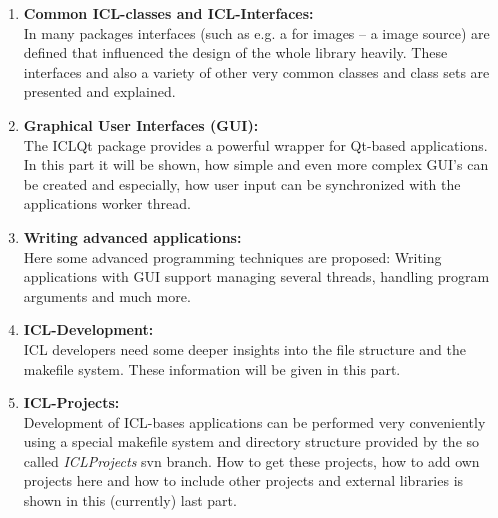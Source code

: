 \begin{enumerate}
\item \textbf{Common ICL-classes and ICL-Interfaces:}\\ In many packages interfaces (such as e.g. a  for images -- a image source) are defined that influenced the design of the whole library heavily. These interfaces and also a variety of other very common classes and class sets are presented and explained.
\item \textbf{Graphical User Interfaces (GUI):}\\ The ICLQt package provides a powerful wrapper for Qt-based applications. In this part it will be shown, how simple and even more complex GUI's can be created and especially, how user input can be synchronized with the applications worker thread.
\item \textbf{Writing advanced applications:}\\ Here some advanced programming techniques are proposed: Writing applications with GUI support managing several threads, handling program arguments and much more.
\item \textbf{ICL-Development:}\\ICL developers need some deeper insights into the file structure and the makefile system. These information will be given in this part.
\item \textbf{ICL-Projects:}\\Development of ICL-bases applications can be performed very conveniently using a special makefile system and directory structure provided by the so called \emph{ICLProjects} svn branch. How to get these projects, how to add own projects here and how to include other projects and external libraries is shown in this (currently) last part. 
\end{enumerate} 
